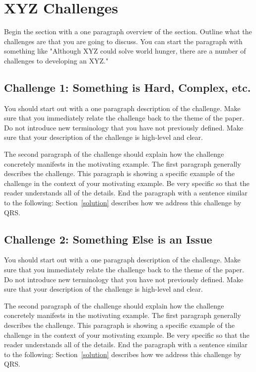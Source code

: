 \section{XYZ Challenges}
\label{challenges}

Begin the section with a one paragraph overview
of the section. Outline what the challenges are that
you are going to discuss. You can start the paragraph
with something like "Although XYZ could solve world
hunger, there are a number of challenges to developing
an XYZ."

\subsection{Challenge 1: Something is Hard, Complex, etc.}
\label{challenge1}

You should start out with a one paragraph description of
the challenge. Make sure that you immediately relate the
challenge back to the theme of the paper. Do not introduce
new terminology that you have not previously defined. Make
sure that your description of the challenge is high-level
and clear.

The second paragraph of the challenge should explain how
the challenge concretely manifests in the motivating example.
The first paragraph generally describes the challenge. This
paragraph is showing a specific example of the challenge in
the context of your motivating example. Be very specific
so that the reader understands all of the details. End
the paragraph with a sentence similar to the following:
Section~\ref{solution} describes how we address this
challenge by QRS.

\subsection{Challenge 2: Something Else is an Issue}
\label{challenge2}

You should start out with a one paragraph description of
the challenge. Make sure that you immediately relate the
challenge back to the theme of the paper. Do not introduce
new terminology that you have not previously defined. Make
sure that your description of the challenge is high-level
and clear.

The second paragraph of the challenge should explain how
the challenge concretely manifests in the motivating example.
The first paragraph generally describes the challenge. This
paragraph is showing a specific example of the challenge in
the context of your motivating example. Be very specific
so that the reader understands all of the details. End
the paragraph with a sentence similar to the following:
Section~\ref{solution} describes how we address this
challenge by QRS.
 
